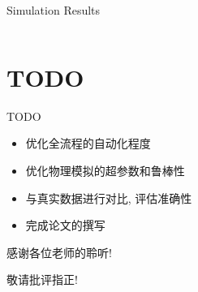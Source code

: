\documentclass{beamer}
\begin{document}
\begin{frame}{Simulation Results}
\begin{table}
\begin{tabular}{ccc}
    \end{tabular}
  \end{table}
\end{frame}

\section{TODO}

\begin{frame}{TODO}
  \begin{itemize}
    \item 优化全流程的自动化程度
    \item 优化物理模拟的超参数和鲁棒性
    \item 与真实数据进行对比, 评估准确性
    \item 完成论文的撰写
  \end{itemize}
\end{frame}

\begin{frame}
  \begin{center}
    \Huge
    感谢各位老师的聆听!

    敬请批评指正!
  \end{center}
\end{frame}
\end{document}
